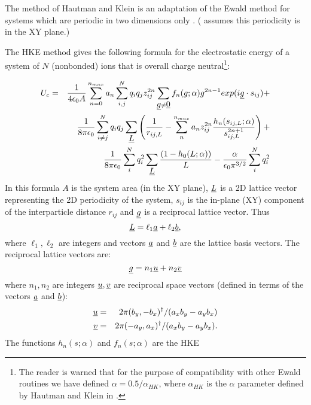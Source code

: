 The method of Hautman and Klein is an adaptation of the Ewald method
for systems which are periodic in two dimensions only
\cite{hautman-92a}. (\D{} assumes this periodicity is in the XY plane.)

The HKE method gives the following formula for the electrostatic
energy of a system of $N$ (nonbonded) ions that is overall charge
neutral\footnote{The reader is warned that for the purpose of
compatibility with other \D{} Ewald routines we have defined
$\alpha=0.5/\alpha_{HK}$, where $\alpha_{HK}$ is the $\alpha$ parameter
defined by Hautman and Klein in \cite{hautman-92a}.}:

\begin{eqnarray}
U_{c} &=&\frac{1}{4\epsilon_{0}A}\sum_{n=0}^{n_{max}}a_{n}\sum_{i,j}^{N} 
q_{i}q_{j}z_{ij}^{2n}\sum_{\mbox{$\underline{g}$}\ne \mbox{$\underline{0}$}} f_{n}(g;\alpha)
g^{2n-1}exp(i\mbox{$\underline{g}$}\cdot s_{ij}) + \nonumber \\
 & & \frac{1}{8\pi\epsilon_{0}}\sum_{i\ne j}^{N}q_{i}q_{j}\sum_{\mbox{$\underline{L}$}}
\left ( \frac{1}{r_{ij,L}}-\sum_{n}^{n_{max}} a_{n}z_{ij}^{2n}
\frac{h_{n}(s_{ij,L};\alpha)}{s_{ij,L}^{2n+1}}\right )+\nonumber \\
 & & \frac{1}{8\pi\epsilon_{0}}\sum_{i}^{N}q_{i}^{2}\sum_{\mbox{$\underline{L}$}}
\frac{(1-h_{0}(L;\alpha))}{L}-\frac{\alpha}{\epsilon_{0}\pi^{3/2}}\sum_{i}^{N}q_{i}^{2} \label{hke}
\end{eqnarray}
In this formula $A$ is the system area (in the
XY plane), $\mbox{$\underline{L}$}$ is a 2D lattice vector representing the 2D
periodicity of the system, $s_{ij}$ is the in-plane (XY) component of
the interparticle distance $r_{ij}$ and $\mbox{$\underline{g}$}$ is a reciprocal
lattice vector. Thus
\begin{equation}
\mbox{$\underline{L}$}=\ell_{1}\mbox{$\underline{a}$}+\ell_{2}\mbox{$\underline{b}$},
\end{equation}
where $\ell_{1},\ell_{2}$ are integers and vectors $\mbox{$\underline{a}$}$ and
$\mbox{$\underline{b}$}$ are the lattice basis vectors. The reciprocal lattice vectors are:
\begin{equation}
\mbox{$\underline{g}$}=n_{1} \mbox{$\underline{u}$} + n_{2} \mbox{$\underline{v}$}
\end{equation}
where $n_{1},n_{2}$ are integers $\mbox{$\underline{u}$},\mbox{$\underline{v}$}$ are reciprocal space
vectors (defined in terms of the vectors $\mbox{$\underline{a}$}$ and $\mbox{$\underline{b}$}$):
\begin{eqnarray}
\mbox{$\underline{u}$}&=&2\pi(b_{y},-b_{x})^{\dagger}/(a_{x}b_{y}-a_{y}b_{x}) \nonumber \\
\mbox{$\underline{v}$}&=&2\pi(-a_{y},a_{x})^{\dagger}/(a_{x}b_{y}-a_{y}b_{x}).
\end{eqnarray}
The functions $h_{n}(s;\alpha)$ and $f_{n}(s;\alpha)$ are the HKE
